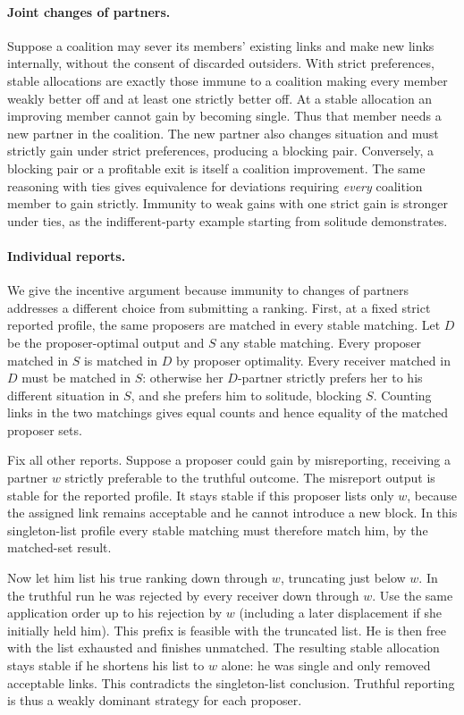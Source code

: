 \documentclass[11pt]{article}
\begin{document}
\paragraph{Joint changes of partners.}
Suppose a coalition may sever its members' existing links and make new links internally, without the consent of discarded outsiders. With strict preferences, stable allocations are exactly those immune to a coalition making every member weakly better off and at least one strictly better off. At a stable allocation an improving member cannot gain by becoming single. Thus that member needs a new partner in the coalition. The new partner also changes situation and must strictly gain under strict preferences, producing a blocking pair. Conversely, a blocking pair or a profitable exit is itself a coalition improvement. The same reasoning with ties gives equivalence for deviations requiring \emph{every} coalition member to gain strictly. Immunity to weak gains with one strict gain is stronger under ties, as the indifferent-party example starting from solitude demonstrates.

\paragraph{Individual reports.}
We give the incentive argument because immunity to changes of partners addresses a different choice from submitting a ranking. First, at a fixed strict reported profile, the same proposers are matched in every stable matching. Let \(D\) be the proposer-optimal output and \(S\) any stable matching. Every proposer matched in \(S\) is matched in \(D\) by proposer optimality. Every receiver matched in \(D\) must be matched in \(S\): otherwise her \(D\)-partner strictly prefers her to his different situation in \(S\), and she prefers him to solitude, blocking \(S\). Counting links in the two matchings gives equal counts and hence equality of the matched proposer sets.

Fix all other reports. Suppose a proposer could gain by misreporting, receiving a partner \(w\) strictly preferable to the truthful outcome. The misreport output is stable for the reported profile. It stays stable if this proposer lists only \(w\), because the assigned link remains acceptable and he cannot introduce a new block. In this singleton-list profile every stable matching must therefore match him, by the matched-set result.

Now let him list his true ranking down through \(w\), truncating just below \(w\). In the truthful run he was rejected by every receiver down through \(w\). Use the same application order up to his rejection by \(w\) (including a later displacement if she initially held him). This prefix is feasible with the truncated list. He is then free with the list exhausted and finishes unmatched. The resulting stable allocation stays stable if he shortens his list to \(w\) alone: he was single and only removed acceptable links. This contradicts the singleton-list conclusion. Truthful reporting is thus a weakly dominant strategy for each proposer.
\end{document}
